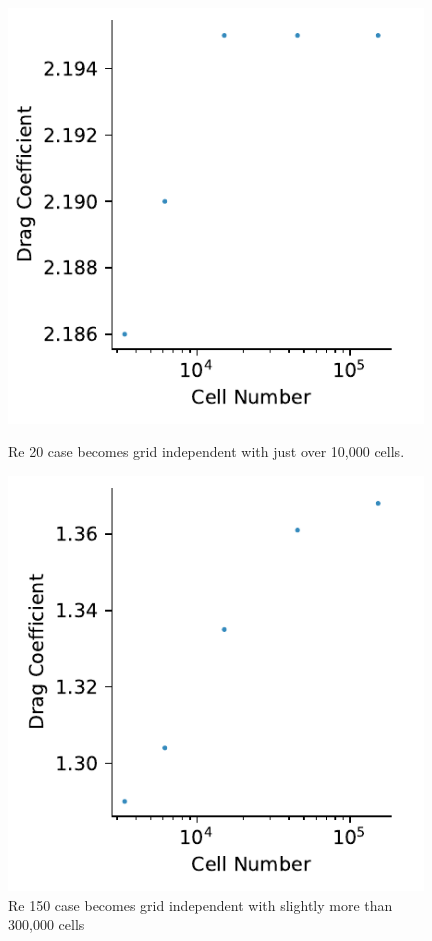 \documentclass[10pt,english]{article}
\begin{document}
\begin{figure}[h!]
\centering
\begin{minipage}{.47\textwidth}
  \centering
\includegraphics[trim={0.0cm 0cm 0.0cm 0cm},clip,width=0.98\textwidth]{grid20}
\vspace{3pt}
\caption{Re 20 case becomes grid independent with just over 10,000 cells.}
\label{f:grid20}
\end{minipage}%
\hspace{10pt}
\begin{minipage}{.47\textwidth}
  \centering
\includegraphics[trim={0.0cm 0cm 0.0cm 0cm},clip,width=0.98\textwidth]{grid150}
\caption{Re 150 case becomes grid independent with slightly more than 300,000 cells}
\label{f:grid150}
\end{minipage}
\end{figure}
\end{document}
